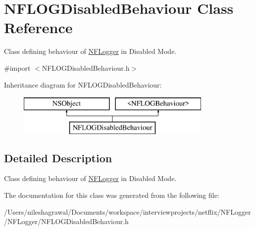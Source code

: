 \hypertarget{interface_n_f_l_o_g_disabled_behaviour}{}\section{N\+F\+L\+O\+G\+Disabled\+Behaviour Class Reference}
\label{interface_n_f_l_o_g_disabled_behaviour}


Class defining behaviour of \hyperlink{interface_n_f_logger}{N\+F\+Logger} in Disabled Mode.  




{\ttfamily \#import $<$N\+F\+L\+O\+G\+Disabled\+Behaviour.\+h$>$}

Inheritance diagram for N\+F\+L\+O\+G\+Disabled\+Behaviour\+:\begin{figure}[H]
\begin{center}
\leavevmode
\includegraphics[height=2.000000cm]{interface_n_f_l_o_g_disabled_behaviour}
\end{center}
\end{figure}


\subsection{Detailed Description}
Class defining behaviour of \hyperlink{interface_n_f_logger}{N\+F\+Logger} in Disabled Mode. 

The documentation for this class was generated from the following file\+:\begin{DoxyCompactItemize}
\item 
/\+Users/nileshagrawal/\+Documents/workspace/interviewprojects/netflix/\+N\+F\+Logger/\+N\+F\+Logger/N\+F\+L\+O\+G\+Disabled\+Behaviour.\+h\end{DoxyCompactItemize}

